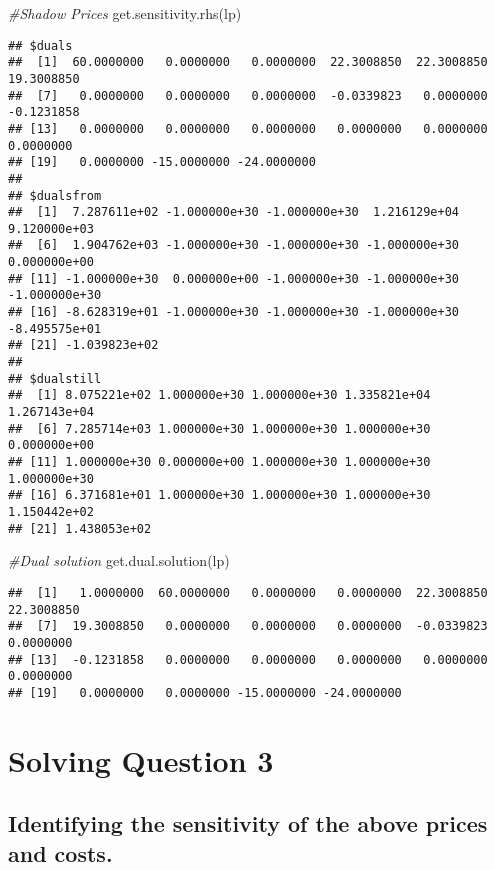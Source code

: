 \documentclass[
]{article}
\newenvironment{Shaded}{\begin{snugshade}}{\end{snugshade}}
\newcommand{\CommentTok}[1]{\textcolor[rgb]{0.56,0.35,0.01}{\textit{#1}}}
\newcommand{\FunctionTok}[1]{\textcolor[rgb]{0.00,0.00,0.00}{#1}}
\newcommand{\NormalTok}[1]{#1}
\begin{document}
\begin{Shaded}
\begin{Highlighting}[]
\CommentTok{\#Shadow Prices}
\FunctionTok{get.sensitivity.rhs}\NormalTok{(lp)}
\end{Highlighting}
\end{Shaded}

\begin{verbatim}
## $duals
##  [1]  60.0000000   0.0000000   0.0000000  22.3008850  22.3008850  19.3008850
##  [7]   0.0000000   0.0000000   0.0000000  -0.0339823   0.0000000  -0.1231858
## [13]   0.0000000   0.0000000   0.0000000   0.0000000   0.0000000   0.0000000
## [19]   0.0000000 -15.0000000 -24.0000000
## 
## $dualsfrom
##  [1]  7.287611e+02 -1.000000e+30 -1.000000e+30  1.216129e+04  9.120000e+03
##  [6]  1.904762e+03 -1.000000e+30 -1.000000e+30 -1.000000e+30  0.000000e+00
## [11] -1.000000e+30  0.000000e+00 -1.000000e+30 -1.000000e+30 -1.000000e+30
## [16] -8.628319e+01 -1.000000e+30 -1.000000e+30 -1.000000e+30 -8.495575e+01
## [21] -1.039823e+02
## 
## $dualstill
##  [1] 8.075221e+02 1.000000e+30 1.000000e+30 1.335821e+04 1.267143e+04
##  [6] 7.285714e+03 1.000000e+30 1.000000e+30 1.000000e+30 0.000000e+00
## [11] 1.000000e+30 0.000000e+00 1.000000e+30 1.000000e+30 1.000000e+30
## [16] 6.371681e+01 1.000000e+30 1.000000e+30 1.000000e+30 1.150442e+02
## [21] 1.438053e+02
\end{verbatim}

\begin{Shaded}
\begin{Highlighting}[]
\CommentTok{\#Dual solution}
\FunctionTok{get.dual.solution}\NormalTok{(lp)}
\end{Highlighting}
\end{Shaded}

\begin{verbatim}
##  [1]   1.0000000  60.0000000   0.0000000   0.0000000  22.3008850  22.3008850
##  [7]  19.3008850   0.0000000   0.0000000   0.0000000  -0.0339823   0.0000000
## [13]  -0.1231858   0.0000000   0.0000000   0.0000000   0.0000000   0.0000000
## [19]   0.0000000   0.0000000 -15.0000000 -24.0000000
\end{verbatim}

\hypertarget{solving-question-3}{%
\section{Solving Question 3}\label{solving-question-3}}

\hypertarget{identifying-the-sensitivity-of-the-above-prices-and-costs.}{%
\subsection{Identifying the sensitivity of the above prices and
costs.}\label{identifying-the-sensitivity-of-the-above-prices-and-costs.}}
\end{document}
